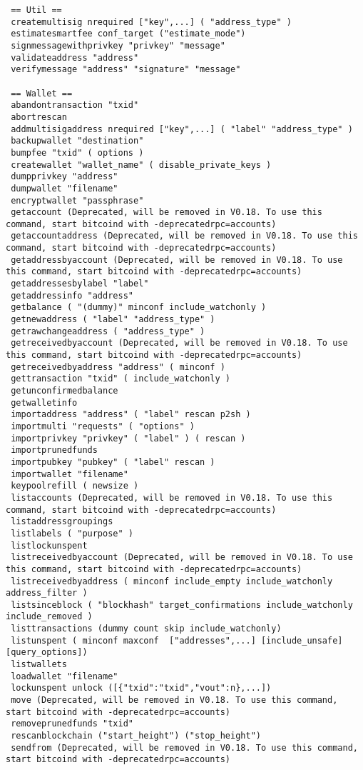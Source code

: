 \begin{lstlisting}
 == Util ==
 createmultisig nrequired ["key",...] ( "address_type" )
 estimatesmartfee conf_target ("estimate_mode")
 signmessagewithprivkey "privkey" "message"
 validateaddress "address"
 verifymessage "address" "signature" "message"

 == Wallet ==
 abandontransaction "txid"
 abortrescan
 addmultisigaddress nrequired ["key",...] ( "label" "address_type" )
 backupwallet "destination"
 bumpfee "txid" ( options ) 
 createwallet "wallet_name" ( disable_private_keys )
 dumpprivkey "address"
 dumpwallet "filename"
 encryptwallet "passphrase"
 getaccount (Deprecated, will be removed in V0.18. To use this command, start bitcoind with -deprecatedrpc=accounts)
 getaccountaddress (Deprecated, will be removed in V0.18. To use this command, start bitcoind with -deprecatedrpc=accounts)
 getaddressbyaccount (Deprecated, will be removed in V0.18. To use this command, start bitcoind with -deprecatedrpc=accounts)
 getaddressesbylabel "label"
 getaddressinfo "address"
 getbalance ( "(dummy)" minconf include_watchonly )
 getnewaddress ( "label" "address_type" )
 getrawchangeaddress ( "address_type" )
 getreceivedbyaccount (Deprecated, will be removed in V0.18. To use this command, start bitcoind with -deprecatedrpc=accounts)
 getreceivedbyaddress "address" ( minconf )
 gettransaction "txid" ( include_watchonly )
 getunconfirmedbalance
 getwalletinfo
 importaddress "address" ( "label" rescan p2sh )
 importmulti "requests" ( "options" )
 importprivkey "privkey" ( "label" ) ( rescan )
 importprunedfunds
 importpubkey "pubkey" ( "label" rescan )
 importwallet "filename"
 keypoolrefill ( newsize )
 listaccounts (Deprecated, will be removed in V0.18. To use this command, start bitcoind with -deprecatedrpc=accounts)
 listaddressgroupings
 listlabels ( "purpose" )
 listlockunspent
 listreceivedbyaccount (Deprecated, will be removed in V0.18. To use this command, start bitcoind with -deprecatedrpc=accounts)
 listreceivedbyaddress ( minconf include_empty include_watchonly address_filter )
 listsinceblock ( "blockhash" target_confirmations include_watchonly include_removed )
 listtransactions (dummy count skip include_watchonly)
 listunspent ( minconf maxconf  ["addresses",...] [include_unsafe] [query_options])
 listwallets
 loadwallet "filename"
 lockunspent unlock ([{"txid":"txid","vout":n},...])
 move (Deprecated, will be removed in V0.18. To use this command, start bitcoind with -deprecatedrpc=accounts)
 removeprunedfunds "txid"
 rescanblockchain ("start_height") ("stop_height")
 sendfrom (Deprecated, will be removed in V0.18. To use this command, start bitcoind with -deprecatedrpc=accounts)

\end{lstlisting}
